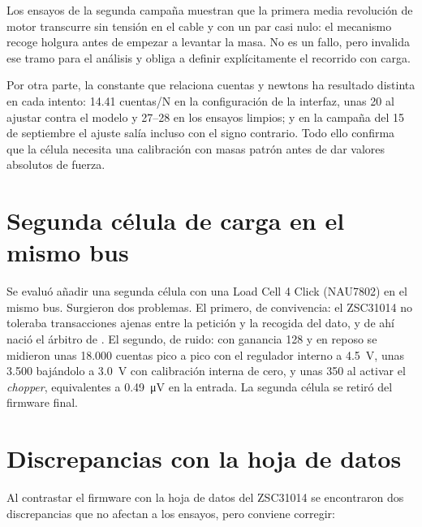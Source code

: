 Los ensayos de la segunda campaña muestran que la primera media revolución de motor transcurre sin
tensión en el cable y con un par casi nulo: el mecanismo recoge holgura antes de empezar a levantar
la masa. No es un fallo, pero invalida ese tramo para el análisis y obliga a definir explícitamente
el recorrido con carga.

Por otra parte, la constante que relaciona cuentas y newtons ha resultado distinta en cada intento:
\num{14.41} cuentas/N en la configuración de la interfaz, unas \num{20} al ajustar contra el
modelo y \SIrange{27}{28}{} en los ensayos limpios; y en la campaña del 15 de septiembre el ajuste
salía incluso con el signo contrario. Todo ello confirma que la célula necesita una calibración con
masas patrón antes de dar valores absolutos de fuerza.

\section{Segunda célula de carga en el mismo bus}
\label{sec:prob-nau}

Se evaluó añadir una segunda célula con una Load Cell 4 Click (NAU7802) en el mismo bus. Surgieron
dos problemas. El primero, de convivencia: el ZSC31014 no toleraba transacciones ajenas entre la
petición y la recogida del dato, y de ahí nació el árbitro de . El segundo, de
ruido: con ganancia 128 y en reposo se midieron unas 18.000 cuentas pico a pico con el regulador
interno a \SI{4.5}{\volt}, unas 3.500 bajándolo a \SI{3.0}{\volt} con calibración interna de cero, y
unas 350 al activar el \emph{chopper}, equivalentes a \SI{0.49}{\micro\volt} en la entrada. La
segunda célula se retiró del firmware final.

\section{Discrepancias con la hoja de datos}
\label{sec:prob-estado}

Al contrastar el firmware con la hoja de datos del ZSC31014 se encontraron dos discrepancias que no
afectan a los ensayos, pero conviene corregir:

